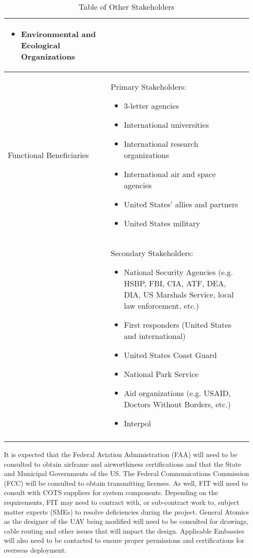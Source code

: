\begin{fullwidth}
\begin{longtable}{ | p{5cm} | p{12cm} | }
\begin{itemize}
            \item Environmental and Ecological Organizations
        \end{itemize} \\
        \hline
        Functional Beneficiaries &
        Primary Stakeholders:
        \begin{itemize}
            \item 3-letter agencies
            \item International universities
            \item International research organizations
            \item International air and space agencies
            \item United States' allies and partners
            \item United States military
        \end{itemize} \\
         &
        Secondary Stakeholders:
        \begin{itemize}
            \item National Security Agencies (e.g. HSBP, FBI, CIA, ATF, DEA, DIA, US Marshals Service, local law enforcement, etc.)
            \item First responders (United States and international)
            \item United States Coast Guard
            \item National Park Service
            \item Aid organizations (e.g. USAID, Doctors Without Borders, etc.)
            \item Interpol
        \end{itemize} \\
        \hline
        \caption{Table of Other Stakeholders}
        \label{tab:other_stakeholders}
    \end{longtable}
    
    It is expected that the Federal Aviation Administration (FAA) will need to be consulted to obtain airframe and airworthiness certifications and that the State and Municipal Governments of the US. The Federal Communications Commission (FCC) will be consulted to obtain transmitting licenses. As well, FIT will need to consult with COTS suppliers for system components. Depending on the requirements, FIT may need to contract with, or sub-contract work to, subject matter experts (SMEs) to resolve deficiencies during the project.  General Atomics as the designer of the UAV being modified will need to be consulted for drawings, cable routing and other issues that will impact the design. Applicable Embassies will also need to be contacted to ensure proper permissions and certifications for overseas deployment.
    

\end{fullwidth}
